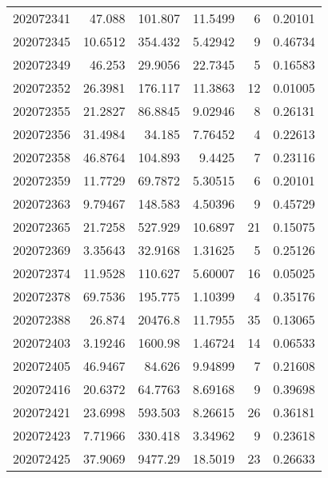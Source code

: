 \begin{tabular}{rrrrrr}
 202072341 &         47.088   &      101.807  &           11.5499  &           6 & 0.20101 \\
 202072345 &         10.6512  &      354.432  &            5.42942 &           9 & 0.46734 \\
 202072349 &         46.253   &       29.9056 &           22.7345  &           5 & 0.16583 \\
 202072352 &         26.3981  &      176.117  &           11.3863  &          12 & 0.01005 \\
 202072355 &         21.2827  &       86.8845 &            9.02946 &           8 & 0.26131 \\
 202072356 &         31.4984  &       34.185  &            7.76452 &           4 & 0.22613 \\
 202072358 &         46.8764  &      104.893  &            9.4425  &           7 & 0.23116 \\
 202072359 &         11.7729  &       69.7872 &            5.30515 &           6 & 0.20101 \\
 202072363 &          9.79467 &      148.583  &            4.50396 &           9 & 0.45729 \\
 202072365 &         21.7258  &      527.929  &           10.6897  &          21 & 0.15075 \\
 202072369 &          3.35643 &       32.9168 &            1.31625 &           5 & 0.25126 \\
 202072374 &         11.9528  &      110.627  &            5.60007 &          16 & 0.05025 \\
 202072378 &         69.7536  &      195.775  &            1.10399 &           4 & 0.35176 \\
 202072388 &         26.874   &    20476.8    &           11.7955  &          35 & 0.13065 \\
 202072403 &          3.19246 &     1600.98   &            1.46724 &          14 & 0.06533 \\
 202072405 &         46.9467  &       84.626  &            9.94899 &           7 & 0.21608 \\
 202072416 &         20.6372  &       64.7763 &            8.69168 &           9 & 0.39698 \\
 202072421 &         23.6998  &      593.503  &            8.26615 &          26 & 0.36181 \\
 202072423 &          7.71966 &      330.418  &            3.34962 &           9 & 0.23618 \\
 202072425 &         37.9069  &     9477.29   &           18.5019  &          23 & 0.26633 \\

\end{tabular}
